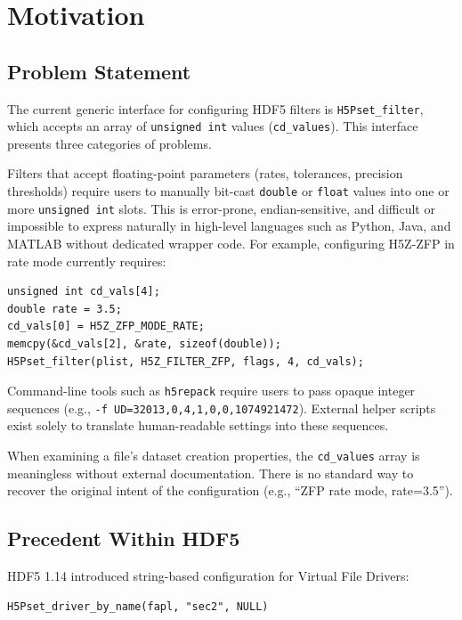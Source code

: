 \documentclass[../HDF5_RFC.tex]{subfiles}
\begin{document}
\section{Motivation}
\label{sec:motivation}

\subsection{Problem Statement}

The current generic interface for configuring HDF5 filters is \texttt{H5Pset\_filter},
which accepts an array of \texttt{unsigned int} values (\texttt{cd\_values}). This interface
presents three categories of problems.

Filters that accept floating-point parameters (rates,
tolerances, precision thresholds) require users to manually bit-cast \texttt{double}
or \texttt{float} values into one or more \texttt{unsigned int} slots. This is error-prone,
endian-sensitive, and difficult or impossible to express naturally in
high-level languages such as Python, Java, and MATLAB without dedicated
wrapper code. For example, configuring H5Z-ZFP in rate mode currently
requires:

\begin{verbatim}
unsigned int cd_vals[4];
double rate = 3.5;
cd_vals[0] = H5Z_ZFP_MODE_RATE;
memcpy(&cd_vals[2], &rate, sizeof(double));
H5Pset_filter(plist, H5Z_FILTER_ZFP, flags, 4, cd_vals);
\end{verbatim}

Command-line tools such as \texttt{h5repack} require users to pass
opaque integer sequences (e.g., \texttt{-f UD=32013,0,4,1,0,0,1074921472}). External
helper scripts exist solely to translate human-readable settings into these
sequences.

When examining a file's dataset creation properties,
the \texttt{cd\_values} array is meaningless without external documentation. There is
no standard way to recover the original intent of the configuration (e.g.,
``ZFP rate mode, rate=3.5'').

\subsection{Precedent Within HDF5}

HDF5 1.14 introduced string-based configuration for Virtual File Drivers:

\begin{verbatim}
H5Pset_driver_by_name(fapl, "sec2", NULL)
\end{verbatim}
\end{document}
